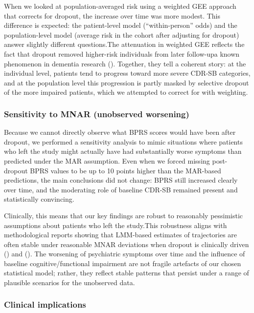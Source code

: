 \documentclass[
  9pt,
  letterpaper,
  DIV=11,
  numbers=noendperiod]{scrartcl}
\begin{document}
When we looked at population-averaged risk using a weighted GEE approach
that corrects for dropout, the increase over time was more modest. This
difference is expected: the patient-level model (``within-person'' odds)
and the population-level model (average risk in the cohort after
adjusting for dropout) answer slightly different questions.The
attenuation in weighted GEE reflects the fact that dropout removed
higher-risk individuals from later follow-upa known phenomenon in
dementia research (). Together, they tell a coherent story: at the
individual level, patients tend to progress toward more severe CDR-SB
categories, and at the population level this progression is partly
masked by selective dropout of the more impaired patients, which we
attempted to correct for with weighting.

\subsubsection{Sensitivity to MNAR (unobserved
worsening)}\label{sensitivity-to-mnar-unobserved-worsening}

Because we cannot directly observe what BPRS scores would have been
after dropout, we performed a sensitivity analysis to mimic situations
where patients who left the study might actually have had substantially
worse symptoms than predicted under the MAR assumption. Even when we
forced missing post-dropout BPRS values to be up to 10 points higher
than the MAR-based predictions, the main conclusions did not change:
BPRS still increased clearly over time, and the moderating role of
baseline CDR-SB remained present and statistically convincing.

Clinically, this means that our key findings are robust to reasonably
pessimistic assumptions about patients who left the study.This
robustness aligns with methodological reports showing that LMM-based
estimates of trajectories are often stable under reasonable MNAR
deviations when dropout is clinically driven
() and
(). The worsening
of psychiatric symptoms over time and the influence of baseline
cognitive/functional impairment are not fragile artefacts of our chosen
statistical model; rather, they reflect stable patterns that persist
under a range of plausible scenarios for the unobserved data.

\subsubsection{Clinical implications}\label{clinical-implications}
\end{document}
